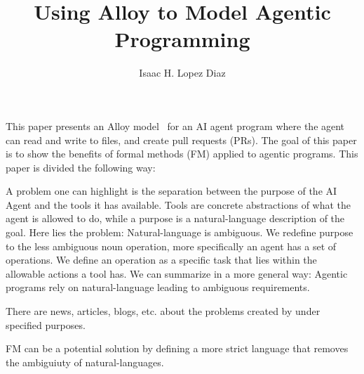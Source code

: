\documentclass{acmart}
\title{Using Alloy to Model Agentic Programming}
\author{Isaac H. Lopez Diaz}
\begin{document}
\begin{abstract}
    
\end{abstract}

\maketitle

This paper presents an Alloy model~\cite{alloy} for an AI agent
program where the agent can read and write to files, and create pull
requests (PRs). The goal of this paper is to show the benefits
of formal methods (FM) applied to agentic programs. This paper
is divided the following way:

A problem one can highlight is the separation between the purpose
of the AI Agent and the tools it has available. Tools are concrete
abstractions of what the agent is allowed to do, while a purpose
is a natural-language description of the goal. Here lies the problem:
Natural-language is ambiguous. We redefine purpose to the less ambiguous
noun operation, more specifically an agent has a set of operations. 
We define an operation as a specific task that lies within the allowable
actions a tool has. We can summarize in a more general way:
Agentic programs rely on natural-language leading to ambiguous requirements.

There are news, articles, blogs, etc. about the problems created by
under specified purposes.

FM can be a potential solution by defining a more strict language
that removes the ambiguiuty of natural-languages.


\end{document}
